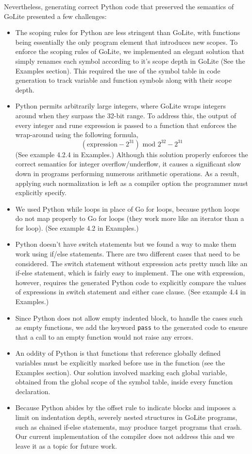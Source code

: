 \documentclass{article}
\begin{document}
Nevertheless, generating correct Python code that preserved the semantics of GoLite presented a few challenges:
\begin{itemize}
\item The scoping rules for Python are less stringent than GoLite, with functions being essentially the only program element that introduces new scopes. To enforce the scoping rules of GoLite, we implemented an elegant solution that simply renames each symbol according to it's scope depth in GoLite (See the Examples section). This required the use of the symbol table in code generation to track variable and function symbols along with their scope depth.
\item Python permits arbitrarily large integers, where GoLite wraps integers around when they surpass the 32-bit range. To address this, the output of every integer and rune expression is passed to a function that enforces the wrap-around using the following formula,
\begin{equation}
(\mbox{expression} - 2^{31}) \mbox{ mod } 2^{32} - 2^{31}
\end{equation}
(See example 4.2.4 in Examples.) Although this solution properly enforces the correct semantics for integer overflow/underflow, it causes a significant slow down in programs performing numerous arithmetic operations. As a result, applying such normalization is left as a compiler option the programmer must explicitly specify.
\item We used Python while loops in place of Go for loops, because python loops do not map properly to Go for loops (they work more like an iterator than a for loop). (See example 4.2 in Examples.)
\item Python doesn't have switch statements but we found a way to make them work using if/else statements. There are two different cases that need to be considered. The switch statement without expression acts pretty much like an if-else statement, which is fairly easy to implement. The one with expression, however, requires the generated Python code to explicitly compare the values of expressions in switch statement and either case clause. (See example 4.4 in Examples.)
\item Since Python does not allow empty indented block, to handle the cases such as empty functions, we add the keyword \texttt{pass} to the generated code to ensure that a call to an empty function would not raise any errors.
\item An oddity of Python is that functions that reference globally defined variables must be explicitly marked before use in the function (see the Examples section). Our solution involved marking each global variable, obtained from the global scope of the symbol table, inside every function declaration.
\item Because Python abides by the offset rule to indicate blocks and imposes a limit on indentation depth, severely nested structures in GoLite programs, such as chained if-else statements, may produce target programs that crash. Our current implementation of the compiler does not address this and we leave it as a topic for future work.
\end{itemize}
\end{document}
